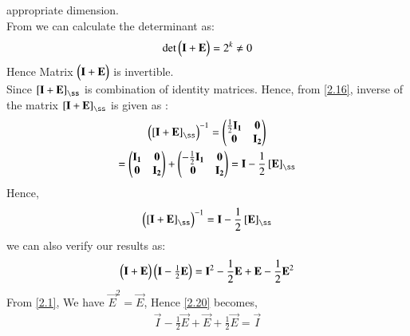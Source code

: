 \documentclass[journal,12pt,twocolumn]{IEEEtran}
\begin{document}
	appropriate dimension.\\
	From  we can calculate the determinant as:
	\begin{align}
	\text{det}\begin{pmatrix}\mathbf{I} + \mathbf{E}\end{pmatrix} = 2^k \neq  0
	\end{align}
	Hence Matrix $\begin{pmatrix}\mathbf{I}+ \mathbf{E}\end{pmatrix}$ is invertible.\\
	Since $\left[ \vec{I} + \vec{E}\right]_{\ss}$ is combination of identity matrices. Hence, from \eqref{2.16}, inverse of the matrix  $\left[ \vec{I} + \vec{E}\right]_{\ss}$ is given as :
	\begin{multline}
	\myvec{\left[ \vec{I} + \vec{E}\right]_{\ss} }^{-1} = \myvec{\frac{1}{2}\vec{I_1} & \vec{0} \\ \vec{0} & \vec{I_2} }\\
	=   \myvec{\vec{I_1} & \vec{0} \\
		\vec{0} & \vec{I_2} } +  \myvec{-\frac{1}{2}\vec{I_1} & \vec{0} \\
		\vec{0} & \vec{I_2}} = \vec{I} - \frac{1}{2}\left[\vec{E}\right]_{\ss}
	\end{multline}
	Hence,
	\begin{align}
	\myvec{\left[ \vec{I} + \vec{E}\right]_{\ss} }^{-1} = \vec{I} - \frac{1}{2}\left[\vec{E}\right]_{\ss}
	\end{align}
	we can also verify our results as:
	\begin{multline}
	\begin{pmatrix}\mathbf{I} + \mathbf{E}\end{pmatrix}\begin{pmatrix}\mathbf{I} - \frac{1}{2}\mathbf{E}\end{pmatrix} = \mathbf{I}^2- \frac{1}{2}\mathbf{E} +\mathbf{E}- \frac{1}{2}\mathbf{E}^2 \label{2.20}
	\end{multline}
	From \eqref{2.1}, We have $\vec{E}^2 = \vec{E}$, Hence \eqref{2.20} becomes,
	\begin{align}
	\vec{I} - \frac{1}{2}\vec{E} +\vec{E} + \frac{1}{2}\vec{E} = \vec{I}
	\end{align}
	
\end{document}

